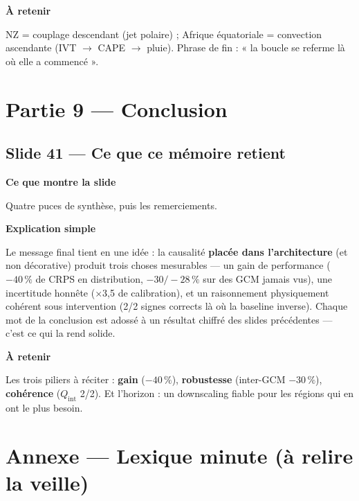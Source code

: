 \documentclass[11pt,a4paper]{article}
\newcommand{\slide}[2]{\subsection*{\textcolor{bleu}{Slide #1 --- #2}}}
\newcommand{\bloc}[1]{\par\medskip\noindent\textcolor{accent}{\textbf{#1}}\par\nopagebreak\smallskip}
\begin{document}
\bloc{À retenir}
NZ = couplage descendant (jet polaire) ; Afrique équatoriale = convection ascendante (IVT $\to$ CAPE $\to$ pluie). Phrase de fin : « la boucle se referme là où elle a commencé ».

\section{Partie 9 --- Conclusion}

\slide{41}{Ce que ce mémoire retient}

\bloc{Ce que montre la slide}
Quatre puces de synthèse, puis les remerciements.

\bloc{Explication simple}
Le message final tient en une idée : la causalité \textbf{placée dans l'architecture} (et non décorative) produit trois choses mesurables --- un gain de performance ($-40\,\%$ de CRPS en distribution, $-30/-28\,\%$ sur des GCM jamais vus), une incertitude honnête ($\times$3,5 de calibration), et un raisonnement physiquement cohérent sous intervention (2/2 signes corrects là où la baseline inverse). Chaque mot de la conclusion est adossé à un résultat chiffré des slides précédentes --- c'est ce qui la rend solide.

\bloc{À retenir}
Les trois piliers à réciter : \textbf{gain} ($-40\,\%$), \textbf{robustesse} (inter-GCM $-30\,\%$), \textbf{cohérence} ($Q_{\mathrm{int}}$ 2/2). Et l'horizon : un downscaling fiable pour les régions qui en ont le plus besoin.

\section*{Annexe --- Lexique minute (à relire la veille)}
\end{document}
